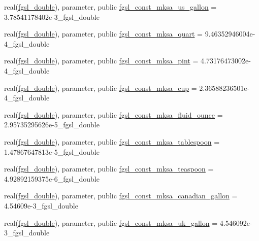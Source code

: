 \begin{DoxyCompactItemize}
real(\hyperlink{namespacefgsl_a9af5113378e0f000eb479d3f90196ddf}{fgsl\+\_\+double}), parameter, public \hyperlink{namespacefgsl_a9c8e297dc4a0fa63d97e1c130cc5248a}{fgsl\+\_\+const\+\_\+mksa\+\_\+us\+\_\+gallon} = 3.\+78541178402e-\/3\+\_\+fgsl\+\_\+double
\item 
real(\hyperlink{namespacefgsl_a9af5113378e0f000eb479d3f90196ddf}{fgsl\+\_\+double}), parameter, public \hyperlink{namespacefgsl_a30b92280c9a587dcda6d603b6c737fc3}{fgsl\+\_\+const\+\_\+mksa\+\_\+quart} = 9.\+46352946004e-\/4\+\_\+fgsl\+\_\+double
\item 
real(\hyperlink{namespacefgsl_a9af5113378e0f000eb479d3f90196ddf}{fgsl\+\_\+double}), parameter, public \hyperlink{namespacefgsl_a11b62fc3ced19e2c4f1ad227de09f9f0}{fgsl\+\_\+const\+\_\+mksa\+\_\+pint} = 4.\+73176473002e-\/4\+\_\+fgsl\+\_\+double
\item 
real(\hyperlink{namespacefgsl_a9af5113378e0f000eb479d3f90196ddf}{fgsl\+\_\+double}), parameter, public \hyperlink{namespacefgsl_af7eed4749b386e3a913ae8e18cadc2bc}{fgsl\+\_\+const\+\_\+mksa\+\_\+cup} = 2.\+36588236501e-\/4\+\_\+fgsl\+\_\+double
\item 
real(\hyperlink{namespacefgsl_a9af5113378e0f000eb479d3f90196ddf}{fgsl\+\_\+double}), parameter, public \hyperlink{namespacefgsl_af688bbef5ebab7dfd674fad9cf5d8bd3}{fgsl\+\_\+const\+\_\+mksa\+\_\+fluid\+\_\+ounce} = 2.\+95735295626e-\/5\+\_\+fgsl\+\_\+double
\item 
real(\hyperlink{namespacefgsl_a9af5113378e0f000eb479d3f90196ddf}{fgsl\+\_\+double}), parameter, public \hyperlink{namespacefgsl_abb32761f02e5a238d65d6c3e48c1c2b9}{fgsl\+\_\+const\+\_\+mksa\+\_\+tablespoon} = 1.\+47867647813e-\/5\+\_\+fgsl\+\_\+double
\item 
real(\hyperlink{namespacefgsl_a9af5113378e0f000eb479d3f90196ddf}{fgsl\+\_\+double}), parameter, public \hyperlink{namespacefgsl_aa58032e706375dbeb56727446a0ffea1}{fgsl\+\_\+const\+\_\+mksa\+\_\+teaspoon} = 4.\+92892159375e-\/6\+\_\+fgsl\+\_\+double
\item 
real(\hyperlink{namespacefgsl_a9af5113378e0f000eb479d3f90196ddf}{fgsl\+\_\+double}), parameter, public \hyperlink{namespacefgsl_a12f46f464315290d696dc0dd7d011aaf}{fgsl\+\_\+const\+\_\+mksa\+\_\+canadian\+\_\+gallon} = 4.\+54609e-\/3\+\_\+fgsl\+\_\+double
\item 
real(\hyperlink{namespacefgsl_a9af5113378e0f000eb479d3f90196ddf}{fgsl\+\_\+double}), parameter, public \hyperlink{namespacefgsl_a15754665dbe5dc6a4976466a653b27a3}{fgsl\+\_\+const\+\_\+mksa\+\_\+uk\+\_\+gallon} = 4.\+546092e-\/3\+\_\+fgsl\+\_\+double

\end{DoxyCompactItemize}

